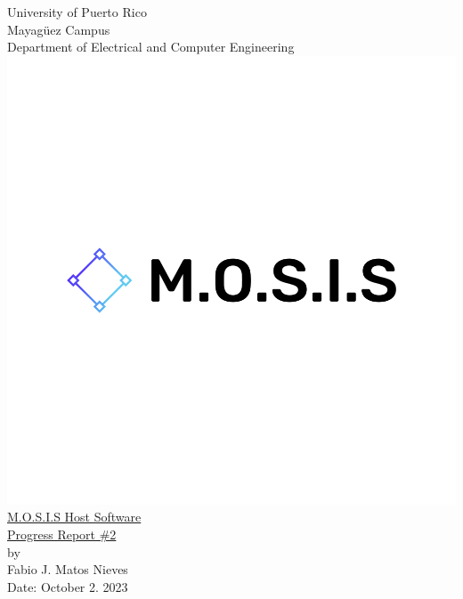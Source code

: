 \begin{titlepage}
  \begin{center}
    \large{University of Puerto Rico\\
    Mayagüez Campus\\
    \vspace{\baselineskip}
    Department of Electrical and Computer Engineering}
  \includegraphics[scale=0.2]{../Title_Page/default.png}\\
    \Huge{\underline{M.O.S.I.S Host Software}\\}
    \Huge{\underline{Progress Report \#2}\\}
    \vspace{5cm}
    \large by\\
    Fabio J. Matos Nieves\\
    Date: October 2. 2023\\
    \normalsize
  \end{center}
\end{titlepage}
